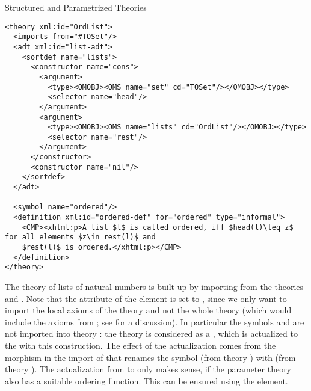 \begin{tchapter}[id=natlist]{Structured and Parametrized Theories}
\begin{lstlisting}[mathescape,label=ordered-list,
  index={theory,imports,adt,sortdef,constructor,argument,symbol,definition}]
<theory xml:id="OrdList">
  <imports from="#TOSet"/>
  <adt xml:id="list-adt">
    <sortdef name="lists">
      <constructor name="cons">
        <argument>
          <type><OMOBJ><OMS name="set" cd="TOSet"/></OMOBJ></type>
          <selector name="head"/>
        </argument>
        <argument>
          <type><OMOBJ><OMS name="lists" cd="OrdList"/></OMOBJ></type>
          <selector name="rest"/>
        </argument>
      </constructor>
      <constructor name="nil"/>
    </sortdef>
  </adt>

  <symbol name="ordered"/>
  <definition xml:id="ordered-def" for="ordered" type="informal">
    <CMP><xhtml:p>A list $l$ is called ordered, iff $head(l)\leq z$ for all elements $z\in rest(l)$ and
    $rest(l)$ is ordered.</xhtml:p></CMP>
  </definition>
</theory>
\end{lstlisting}

The theory {} of lists of natural numbers is built up by
importing from the theories {} and {}. Note that the
attribute {} of the {} element
{} is set to {}, since we
only want to import the local axioms of the theory {} and not the
whole theory {} (which would include the axioms from
{}; see {} for a discussion). In
particular the symbols {} and {} are not imported into
theory {}: the theory {} is considered as a
{}, which is actualized to the
{} with this construction.  The effect of the
actualization comes from the morphism {} in the import of
{} that renames the symbol {} (from theory
{}) with {} (from theory {}). The
actualization from {} to {} only makes sense, if
the parameter theory {} also has a suitable ordering function.  This
can be ensured using the {\omdoc} {} element.


\end{tchapter}
